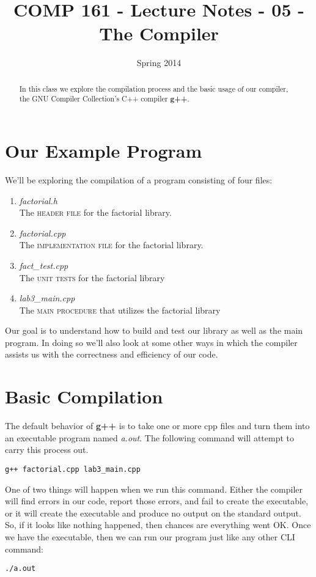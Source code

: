 \documentclass[]{tufte-handout}
\title{COMP 161 - Lecture Notes - 05 - The Compiler}
\date{Spring 2014}
\begin{document}
 
\maketitle

\begin{abstract}
In this class we explore the compilation process and the basic usage of our compiler, the GNU Compiler Collection's C++ compiler \textbf{g++}.
\end{abstract}

\section{Our Example Program}

We'll be exploring the compilation of a program consisting of four files:
\begin{enumerate}
\item \textit{factorial.h} \\ The \textsc{header file} for the factorial library.
\item \textit{factorial.cpp} \\ The \textsc{implementation file} for the factorial library.
\item \textit{fact\_test.cpp} \\ The \textsc{unit tests} for the factorial library
\item \textit{lab3\_main.cpp} \\ The \textsc{main procedure} that utilizes the factorial library
\end{enumerate}
Our goal is to understand how to build and test our library as well as the main program. In doing so we'll also look at some other ways in which the compiler assists us with the correctness and efficiency of our code.  

\section{Basic Compilation}

The default behavior of \textbf{g++} is to take one or more cpp files and turn them into an executable program named \textit{a.out}.  The following command will attempt to carry this process out. 
\begin{verbatim}
g++ factorial.cpp lab3_main.cpp
\end{verbatim}
One of two things will happen when we run this command.  Either the compiler will find errors in our code, report those errors, and fail to create the executable, or it will create the executable and produce no output on the standard output. So, if it looks like nothing happened, then chances are everything went OK. Once we have the executable, then we can run our program just like any other CLI command:
\begin{verbatim}
./a.out
\end{verbatim}
\end{document}
